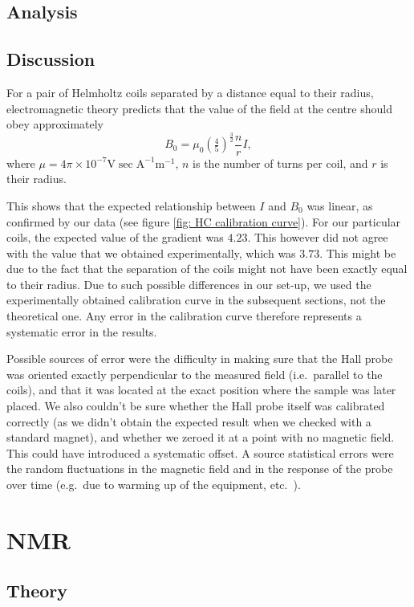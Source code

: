 \documentclass[a4paper]{jpconf}
\numberwithin{equation}{section}
\begin{document}
\subsection{Analysis}



\subsection{Discussion}
For a pair of Helmholtz coils separated by a distance equal to their radius, electromagnetic theory predicts that the value of the field at the centre should obey approximately
\[
	B_0 = \mu_0 \left(\tfrac45\right)^{\tfrac32} \frac{n}{r} I,
\]
where $\mu = 4\pi\times10^{-7} \si{\volt\sec\ampere\tothe{-1}\meter\tothe{-1}}$, $n$ is the number of turns per coil, and $r$ is their radius.

This shows that the expected relationship between $I$ and $B_0$ was linear, as confirmed by our data (see figure \ref{fig: HC calibration curve}).
For our particular coils, the expected value of the gradient was $4.23$. This however did not agree with the value that we obtained experimentally, which was $3.73$. This might be due to the fact that the separation of the coils might not have been exactly equal to their radius. Due to such possible differences in our set-up, we used the experimentally obtained calibration curve in the subsequent sections, not the theoretical one. Any error in the calibration curve therefore represents a systematic error in the results. 

Possible sources of error were the difficulty in making sure that the Hall probe was oriented exactly perpendicular to the measured field (i.e.\ parallel to the coils), and that it was located at the exact position where the sample was later placed. We also couldn't be sure whether the Hall probe itself was calibrated correctly (as we didn't obtain the expected result when we checked with a standard magnet), and whether we zeroed it at a point with no magnetic field. This could have introduced a systematic offset. A source statistical errors were the random fluctuations in the magnetic field and in the response of the probe over time (e.g.\ due to warming up of the equipment, etc.\ ).


\section{NMR} 
\subsection{Theory}
\end{document}

